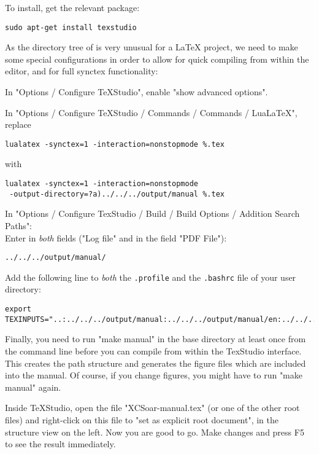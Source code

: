 To install, get the relevant package:

\begin{verbatim}
sudo apt-get install texstudio
\end{verbatim}

As the directory tree of \xc is very unusual for a LaTeX project, we need to make some special configurations in order to allow for quick compiling from within the editor, and for full synctex functionality:

In "Options / Configure TeXStudio", enable "show advanced options".

In "Options / Configure TeXStudio / Commands / Commands / LuaLaTeX", replace
\begin{verbatim}
lualatex -synctex=1 -interaction=nonstopmode %.tex
\end{verbatim}
with
\begin{verbatim}
lualatex -synctex=1 -interaction=nonstopmode
 -output-directory=?a)../../../output/manual %.tex
\end{verbatim}

In "Options / Configure TexStudio / Build / Build Options / Addition Search Paths":\\
Enter in \emph{both} fields ("Log file" and in the field "PDF File"):
\begin{verbatim}
../../../output/manual/
\end{verbatim}


Add the following line to \emph{both} the \texttt{.profile} and the \texttt{.bashrc} file of your user directory:
\begin{maxipage}
\begin{verbatim}
export TEXINPUTS="..:../../../output/manual:../../../output/manual/en:../../..:"
\end{verbatim}
\end{maxipage}


Finally, you need to run "make manual" in the \xc base directory at least once from the command line before you can compile from within the TexStudio interface. This creates the path structure and generates the figure files which are included into the manual. Of course, if you change figures, you might have to run "make manual" again.

Inside TeXStudio, open the file "XCSoar-manual.tex" (or one of the other root files) and right-click on this file to "set as explicit root document", in the structure view on the left. Now you are good to go. Make changes and press F5 to see the result immediately.

